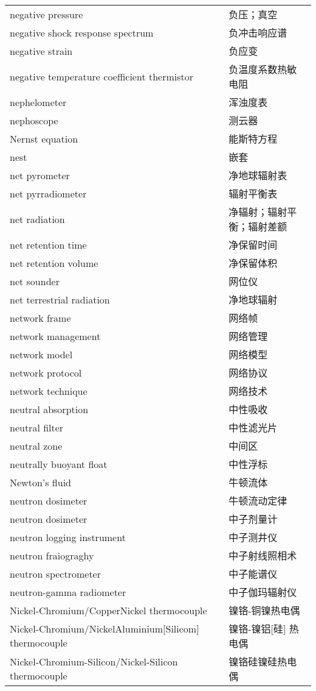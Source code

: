 \documentclass[
]{article}
\begin{document}
\begin{longtable}[]{@{}ll@{}}
negative pressure & 负压；真空 \\
negative shock response spectrum & 负冲击响应谱 \\
negative strain & 负应变 \\
negative temperature coefficient thermistor & 负温度系数热敏电阻 \\
nephelometer & 浑浊度表 \\
nephoscope & 测云器 \\
Nernst equation & 能斯特方程 \\
nest & 嵌套 \\
net pyrometer & 净地球辐射表 \\
net pyrradiometer & 辐射平衡表 \\
net radiation & 净辐射；辐射平衡；辐射差额 \\
net retention time & 净保留时间 \\
net retention volume & 净保留体积 \\
net sounder & 网位仪 \\
net terrestrial radiation & 净地球辐射 \\
network frame & 网络帧 \\
network management & 网络管理 \\
network model & 网络模型 \\
network protocol & 网络协议 \\
network technique & 网络技术 \\
neutral absorption & 中性吸收 \\
neutral filter & 中性滤光片 \\
neutral zone & 中间区 \\
neutrally buoyant float & 中性浮标 \\
Newton's fluid & 牛顿流体 \\
neutron dosimeter & 牛顿流动定律 \\
neutron dosimeter & 中子剂量计 \\
neutron logging instrument & 中子测井仪 \\
neutron fraiograghy & 中子射线照相术 \\
neutron spectrometer & 中子能谱仪 \\
neutron-gamma radiometer & 中子伽玛辐射仪 \\
Nickel-Chromium/CopperNickel thermocouple & 镍铬-铜镍热电偶 \\
Nickel-Chromium/NickelAluminium{[}Silicom{]} thermocouple &
镍铬-镍铝{[}硅{]} 热电偶 \\
Nickel-Chromium-Silicon/Nickel-Silicon thermocouple &
镍铬硅镍硅热电偶 \\

\end{longtable}
\end{document}
